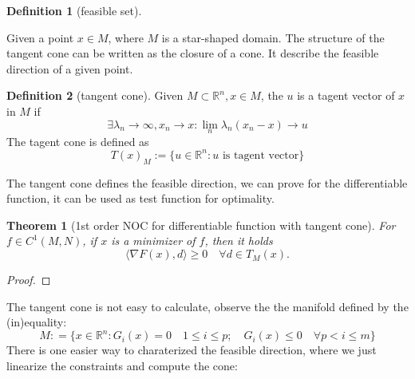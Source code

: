 \documentclass[a4paper,11pt,fleqn, draft]{book}
\newtheorem{theorem}{Theorem}[section]
\theoremstyle{definition}
\newtheorem{definition}{Definition}[section]
\theoremstyle{remark}
\newcommand{\Rn}{\mathbb{R}^n}
\begin{document}
\begin{definition}[feasible set]
\end{definition}

Given a point $x \in M$, where $M$ is a star-shaped domain. The structure of the tangent cone can be written as the closure of a cone. It describe the feasible direction of a given point. 
\begin{definition}[tangent cone]
	Given $M \subset \Rn, x \in M$, the $u$ is a tagent vector of $x$ in $M$ if 
	\begin{equation}
		\exists \lambda_n \rightarrow \infty, x_n \rightarrow x: \lim_n \lambda_n (x_n - x) \rightarrow u
	\end{equation} 
	The tagent cone is defined as 
	\[
	T(x)_M:= \{u \in \Rn: u \text{ is tagent vector} \}
	\]
\end{definition}

The tangent cone defines the feasible direction, we can prove for the differentiable function, it can be used as test function for optimality.

\begin{theorem}[1st order NOC for differentiable function with tangent cone]
	For $f \in C^1(M, N)$, if $x$ is a minimizer of $f$, then it holds
	\begin{equation}
		\langle \nabla F(x), d \rangle \ge 0 \quad \forall d \in T_M(x).
	\end{equation}
\end{theorem}
\begin{proof}
\end{proof}

The tangent cone is not easy to calculate, observe the the manifold defined by the (in)equality: 
\[
M: = \{ x \in \Rn: G_i(x) = 0 \quad 1 \le i \le p ;\quad G_i(x)\le 0 \quad \forall p < i \le m\} 
\]
There is one easier way to charaterized the feasible direction, where we just linearize the constraints and compute the cone:  
\end{document}
